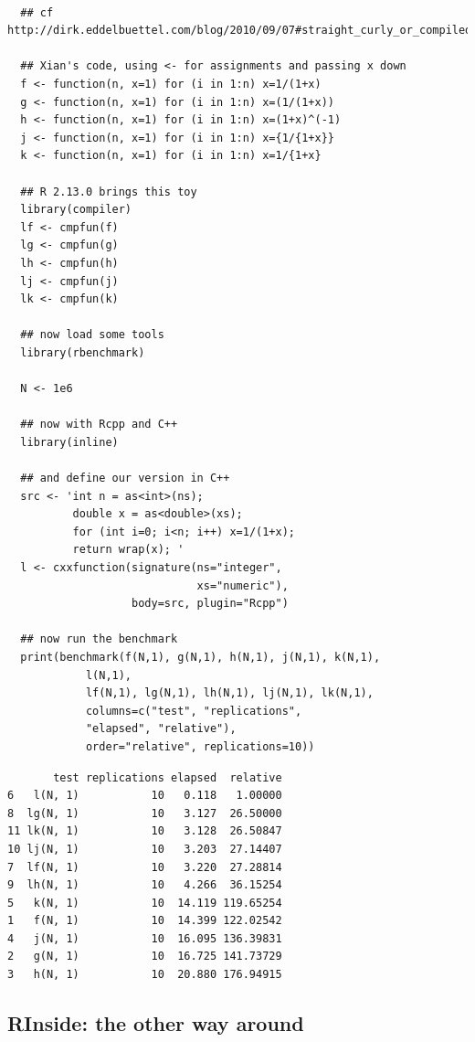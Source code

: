 \documentclass[11pt]{article}
\begin{document}
\begin{verbatim}
  
  ## cf http://dirk.eddelbuettel.com/blog/2010/09/07#straight_curly_or_compiled
  
  ## Xian's code, using <- for assignments and passing x down
  f <- function(n, x=1) for (i in 1:n) x=1/(1+x)
  g <- function(n, x=1) for (i in 1:n) x=(1/(1+x))
  h <- function(n, x=1) for (i in 1:n) x=(1+x)^(-1)
  j <- function(n, x=1) for (i in 1:n) x={1/{1+x}}
  k <- function(n, x=1) for (i in 1:n) x=1/{1+x}
  
  ## R 2.13.0 brings this toy
  library(compiler)
  lf <- cmpfun(f)
  lg <- cmpfun(g)
  lh <- cmpfun(h)
  lj <- cmpfun(j)
  lk <- cmpfun(k)
  
  ## now load some tools
  library(rbenchmark)
  
  N <- 1e6
  
  ## now with Rcpp and C++
  library(inline)
  
  ## and define our version in C++
  src <- 'int n = as<int>(ns);
          double x = as<double>(xs);
          for (int i=0; i<n; i++) x=1/(1+x);
          return wrap(x); '
  l <- cxxfunction(signature(ns="integer",
                             xs="numeric"),
                   body=src, plugin="Rcpp")
  
  ## now run the benchmark
  print(benchmark(f(N,1), g(N,1), h(N,1), j(N,1), k(N,1),
            l(N,1),
            lf(N,1), lg(N,1), lh(N,1), lj(N,1), lk(N,1),
            columns=c("test", "replications",
            "elapsed", "relative"),
            order="relative", replications=10))
\end{verbatim}


\begin{verbatim}
       test replications elapsed  relative
6   l(N, 1)           10   0.118   1.00000
8  lg(N, 1)           10   3.127  26.50000
11 lk(N, 1)           10   3.128  26.50847
10 lj(N, 1)           10   3.203  27.14407
7  lf(N, 1)           10   3.220  27.28814
9  lh(N, 1)           10   4.266  36.15254
5   k(N, 1)           10  14.119 119.65254
1   f(N, 1)           10  14.399 122.02542
4   j(N, 1)           10  16.095 136.39831
2   g(N, 1)           10  16.725 141.73729
3   h(N, 1)           10  20.880 176.94915
\end{verbatim}
\subsection{RInside: the other way around}
\label{sec-3-2}
\end{document}
